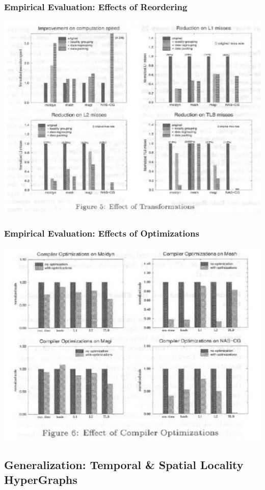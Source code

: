 \documentclass{beamer}
\begin{document}
\begin{frame}[fragile,t]
  \frametitle{Empirical Evaluation: Effects of Reordering}

\includegraphics[width=59ex]{ParTeaserFigs/ResultsReordering1}
 
\end{frame}

\begin{frame}[fragile,t]
  \frametitle{Empirical Evaluation: Effects of Optimizations}

\includegraphics[width=59ex]{ParTeaserFigs/ResultsReordering2}
 
\end{frame}


\subsection{Generalization: Temporal \& Spatial Locality HyperGraphs}
\end{document}
